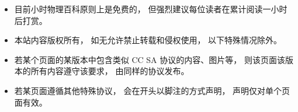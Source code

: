 
\begin{itemize}
\item 目前小时物理百科原则上是免费的， 但强烈建议每位读者在累计阅读一小时后打赏。
\item 本站内容版权所有， 如无允许禁止转载和侵权使用， 以下特殊情况除外。
\item 若某个页面的某版本中包含类似 CC SA 协议的内容、图片等， 则该页面该版本的所有内容遵守该要求， 由同样的协议发布。
\item 若某页面遵循其他特殊协议， 会在开头以脚注的方式声明， 声明仅对单个页面有效。
\end{itemize}
